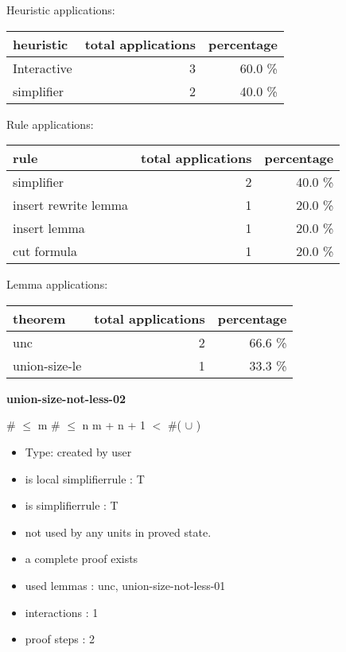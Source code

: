 \documentclass[a4paper]{article}
\begin{document}
\medskip


Heuristic applications:

\begin{supertabular}{l|r|r}
heuristic	& total applications & percentage \\ \hline
Interactive & 3 & 60.0 \% \\
simplifier & 2 & 40.0 \% \\

\end{supertabular}

Rule applications:

\begin{supertabular}{l|r|r}
rule	        & total applications & percentage \\ \hline
simplifier & 2 & 40.0 \% \\
insert rewrite lemma & 1 & 20.0 \% \\
insert lemma & 1 & 20.0 \% \\
cut formula & 1 & 20.0 \% \\

\end{supertabular}

Lemma applications:

\begin{supertabular}{l|r|r}
theorem	        & total applications & percentage \\ \hline
unc & 2 & 66.6 \% \\
union-size-le & 1 & 33.3 \% \\

\end{supertabular}
\pagebreak

{\LARGE\bf union-size-not-less-02}\label{lemma-union-size-not-less-02}

\medskip

 \Fol \#  $\le$ m \And \#  $\le$ n \Imp \Not m + n + 1 $<$ \#( $\cup$ )

\begin{itemize}

\item Type: created by user

\item is local simplifierrule : T
\item is simplifierrule : T
\item not used by any units in proved state.
\item       a complete proof exists
\item       used lemmas  : unc, union-size-not-less-01
\item       interactions : 1
\item       proof steps  : 2
\end{itemize}
\end{document}
